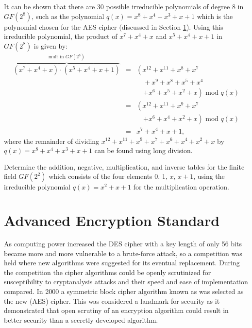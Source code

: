 It can be shown that there are 30 possible irreducible polynomials of degree $8$
in $GF(2^8)$, such as the polynomial $q(x)=x^8+x^4+x^3+x+1$
which is the polynomial chosen for the AES cipher (discussed in Section
\ref{Se:AdvancedEncryptionStandard}).
Using this irreducible polynomial, the product of $x^7+x^4+x$ and $x^5+x^4+x+1$
in $GF(2^8)$ is given by:
\begin{eqnarray*}
  \overbrace{\left(x^7+x^4+x\right)\cdot\left(x^5+x^4+x+1\right)}^{\mbox{mult in }GF(2^8)}
  &=&  \left( x^{12}+x^{11}+x^8+x^7\right. \\
  &&  \quad+x^9+x^8+x^5+x^4 \\
  &&  \quad\left.+x^6+x^5+x^2+x \right) \mbox{ mod } q(x) \\
  &=& \left( x^{12}+x^{11}+x^9+x^7 \right. \\
  &&  \quad\left.+x^6+x^4+x^2+x \right) \mbox{ mod } q(x) \\
  &=& x^7+x^4+x+1,
\end{eqnarray*}
where the remainder of dividing $x^{12}+x^{11}+x^9+x^7+x^6+x^4+x^2+x$
by $q(x)=x^8+x^4+x^3+x+1$ can be found using long division.


\begin{exercise}
  Determine the addition, negative, multiplication, and inverse tables
  for the finite field $GF(2^2)$ which consists of the four elements
  $0$, $1$, $x$, $x+1$, using the irreducible polynomial
  $q(x)=x^2+x+1$ for the multiplication operation.
\end{exercise}



\section{Advanced Encryption Standard}\label{Se:AdvancedEncryptionStandard}


As computing power increased the DES cipher with a key length of only 56 bits
became more and more vulnerable to a brute-force attack,
so a competition was held where new algorithms were suggested for its eventual
replacement. During the competition the cipher algorithms
could be openly scrutinized for susceptibility to cryptanalysis
attacks and their speed and ease of implementation compared.
In 2000 a symmetric block cipher algorithm known as  was
selected as the new  (AES) cipher.
This was considered a landmark for security as it demonstrated that
open scrutiny of an encryption algorithm could result in better security
than a secretly developed algorithm.

